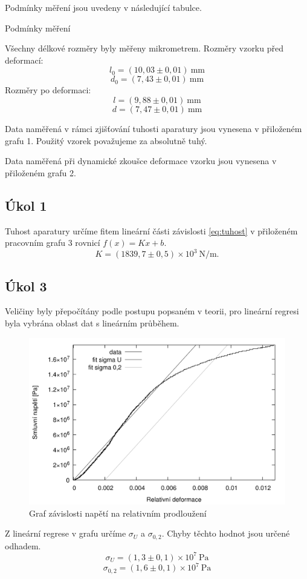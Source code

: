 \documentclass[protokol.tex]{subfiles}
\begin{document}
Podmínky měření jsou uvedeny v následující tabulce.
\begin{table}[H] \label{tab:podminky}
\centering
\setlength{\tabcolsep}{10pt}

\caption{Podmínky měření}
\end{table}

Všechny délkové rozměry byly měřeny mikrometrem. Rozměry vzorku před deformací:
$$ l_0 = (10,03 \pm 0,01) \ \si{\milli\metre} $$
$$ d_0 = ( 7,43 \pm 0,01) \ \si{\milli\metre} $$
Rozměry po deformaci:
$$ l = ( 9,88 \pm 0,01) \ \si{\milli\metre} $$
$$ d = ( 7,47 \pm 0,01) \ \si{\milli\metre} $$


Data naměřená v rámci zjišťování tuhosti aparatury jsou vynesena v přiloženém grafu 1. Použitý vzorek považujeme za absolutně tuhý.

Data naměřená při dynamické zkoušce deformace vzorku jsou vynesena v přiloženém grafu 2.
\subsection*{Úkol 1}
Tuhost aparatury určíme fitem lineární části závislosti \eqref{eq:tuhost} v přiloženém pracovním grafu 3 rovnicí $f(x) = K x + b$.
$$ K = (1839,7 \pm 0,5) \times 10^3 \ \si{\newton\per\metre}. $$

\subsection*{Úkol 3}
Veličiny byly přepočítány podle postupu popsaném v teorii, pro lineární regresi byla vybrána oblast dat s lineárním průběhem.
\begin{figure}[H]
\centering
\includegraphics[resolution=350]{plot/graf}
\caption{Graf závislosti napětí na relativním prodloužení}
\end{figure}
Z lineární regrese v grafu určíme $\sigma_U$ a $\sigma_{0,2}$. Chyby těchto hodnot jsou určené odhadem.
$$ \sigma_U = (1,3 \pm 0,1) \times 10^7 \ \si{\pascal} $$
$$ \sigma_{0,2} = (1,6 \pm 0,1) \times 10^7 \ \si{\pascal} $$
\end{document}
